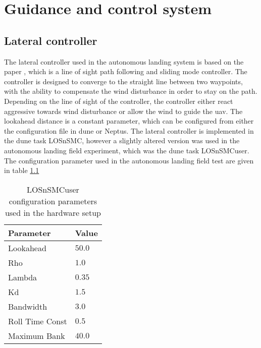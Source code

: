 \chapter{Guidance and control system}\label{AP:ControlGuidanceSystem}
\section{Lateral controller}
The lateral controller used in the autonomous landing system is based on the paper \citep{fortuna2015cascaded}, which is a line of sight path following and sliding mode controller. The controller is designed to converge to the straight line between two waypoints, with the ability to compensate the wind disturbance in order to stay on the path. Depending on the line of sight of the controller, the controller either react aggressive towards wind disturbance or allow the wind to guide the \gls{uav}. The lookahead distance is a constant parameter, which can be configured from either the configuration file in \gls{dune} or Neptus. The lateral controller is implemented in the \gls{dune} task LOSnSMC, however a slightly altered version was used in the autonomous landing field experiment, which was the \gls{dune} task LOSnSMCuser. The configuration parameter used in the autonomous landing field test are given in table \ref{AP:TB:LOSnSMCuser} 

\begin{table}[H]
\centering
\begin{tabular}{| l | l |}
\hline
\textbf{Parameter}	&	\textbf{Value} \\ \hline
Lookahead           &                    $50.0$ \\ \hline
Rho                 &                    $1.0$ \\ \hline
Lambda				&                    $0.35$ \\ \hline
Kd					&                    $1.5$ \\ \hline
Bandwidth			&                    $3.0$ \\ \hline
Roll Time Const		&                    $0.5$ \\ \hline
Maximum Bank		&                    $40.0$ \\ \hline
\end{tabular}
\caption{LOSnSMCuser configuration parameters used in the hardware setup}
\label{AP:TB:LOSnSMCuser}
\end{table}
